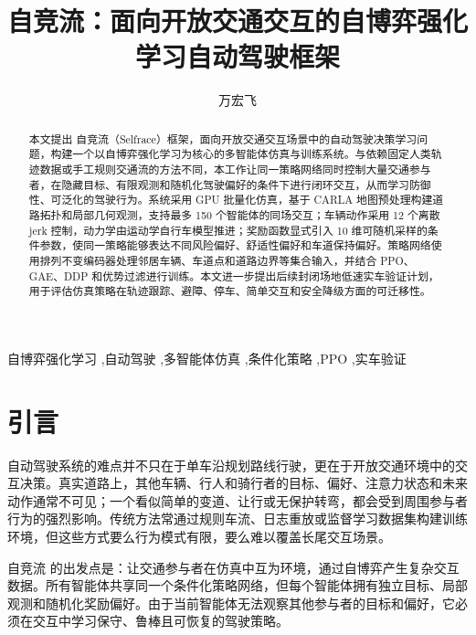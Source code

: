 \documentclass[preprint,12pt]{elsarticle}
\newcommand{\Selfrace}{Selfrace}
\newcommand{\Zijingliu}{自竞流}
\begin{document}
\begin{frontmatter}

\title{\Zijingliu{}：面向开放交通交互的自博弈强化学习自动驾驶框架}

\author[inst1]{万宏飞}

\begin{abstract}
本文提出 \Zijingliu{}（\Selfrace{}）框架，面向开放交通交互场景中的自动驾驶决策学习问题，构建一个以自博弈强化学习为核心的多智能体仿真与训练系统。与依赖固定人类轨迹数据或手工规则交通流的方法不同，本工作让同一策略网络同时控制大量交通参与者，在隐藏目标、有限观测和随机化驾驶偏好的条件下进行闭环交互，从而学习防御性、可泛化的驾驶行为。系统采用 GPU 批量化仿真，基于 CARLA 地图预处理构建道路拓扑和局部几何观测，支持最多 150 个智能体的同场交互；车辆动作采用 12 个离散 jerk 控制，动力学由运动学自行车模型推进；奖励函数显式引入 10 维可随机采样的条件参数，使同一策略能够表达不同风险偏好、舒适性偏好和车道保持偏好。策略网络使用排列不变编码器处理邻居车辆、车道点和道路边界等集合输入，并结合 PPO、GAE、DDP 和优势过滤进行训练。本文进一步提出后续封闭场地低速实车验证计划，用于评估仿真策略在轨迹跟踪、避障、停车、简单交互和安全降级方面的可迁移性。
\end{abstract}

\begin{keyword}
自博弈强化学习 \sep 自动驾驶 \sep 多智能体仿真 \sep 条件化策略 \sep PPO \sep 实车验证
\end{keyword}

\end{frontmatter}

\section{引言}

自动驾驶系统的难点并不只在于单车沿规划路线行驶，更在于开放交通环境中的交互决策。真实道路上，其他车辆、行人和骑行者的目标、偏好、注意力状态和未来动作通常不可见；一个看似简单的变道、让行或无保护转弯，都会受到周围参与者行为的强烈影响。传统方法常通过规则车流、日志重放或监督学习数据集构建训练环境，但这些方式要么行为模式有限，要么难以覆盖长尾交互场景。

\Zijingliu{} 的出发点是：让交通参与者在仿真中互为环境，通过自博弈产生复杂交互数据。所有智能体共享同一个条件化策略网络，但每个智能体拥有独立目标、局部观测和随机化奖励偏好。由于当前智能体无法观察其他参与者的目标和偏好，它必须在交互中学习保守、鲁棒且可恢复的驾驶策略。
\end{document}
